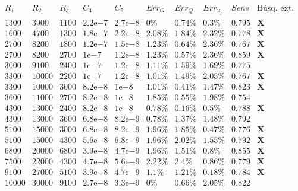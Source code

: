 \documentclass{llncs}
\newcommand{\expnumber}[2]{{#1}\mathrm{e}{#2}}
\begin{document}
	\begin{table}[H]
		$$
		\begin{array}{|c|c|c|c|c|c|c|c|c|c|}
		\hline
		R_1 & R_2 & R_3 & C_4 & C_5 & Err_G & Err_Q & Err_{\omega_p} & Sens & \text{B\'usq. ext.}   \\
		\hline
		1300 & 3900 & 1100 & \expnumber{2.2}{-7} & \expnumber{2.7}{-8} & 0\% & 0.74\% & 0.3\% & 0.795 & \textbf{X} \\
		1600 & 4700 & 1300 & \expnumber{1.8}{-7} & \expnumber{2.2}{-8} & 2.08\% & 1.84\% & 2.32\% & 0.778 & \textbf{X} \\
		2700 & 8200 & 1800 & \expnumber{1.2}{-7} & \expnumber{1.5}{-8} & 1.23\% & 0.64\% & 2.36\% & 0.767 & \textbf{X} \\
		2700 & 8200 & 2700 & \expnumber{1}{-7} & \expnumber{1.2}{-8} & 1.23\% & 0.57\% & 2.36\% & 0.859 & \textbf{X} \\
		3000 & 9100 & 2400 & \expnumber{1}{-7} & \expnumber{1.2}{-8}  & 1.11\% & 1.59\% & 1.69\% & 0.775 &  \\
		3300 & 10000 & 2200 & \expnumber{1}{-7} & \expnumber{1.2}{-8} & 1.01\% & 1.49\% & 2.05\% & 0.767 & \textbf{X} \\
		3300 & 10000 & 3000 & \expnumber{8.2}{-8} & \expnumber{1}{-8} & 1.01\% & 0.41\% & 1.47\% & 0.823 & \textbf{X} \\
		3600 & 11000 & 2700 & \expnumber{8.2}{-8} & \expnumber{1}{-8}  & 1.85\% & 0.55\% & 1.98\% & 0.754 & \\
		4300 & 13000 & 2400 & \expnumber{8.2}{-8} & \expnumber{1}{-8} & 0.78\% & 0.16\% & 0.5\% & 0.788 & \textbf{X} \\
		4300 & 13000 & 3600 & \expnumber{6.8}{-8} & \expnumber{8.2}{-9} & 0.78\% & 1.37\% & 1.48\% & 0.792 & \\
		5100 & 15000 & 3000 & \expnumber{6.8}{-8} & \expnumber{8.2}{-9} & 1.96\% & 1.85\% & 0.47\% & 0.776 & \textbf{X} \\
		5100 & 15000 & 4300 & \expnumber{5.6}{-8} & \expnumber{6.8}{-9} & 1.96\% & 2.02\% & 1.55\% & 0.792 & \textbf{X} \\
		6800 & 20000 & 6800 & \expnumber{3.9}{-8} & \expnumber{4.7}{-9} & 1.96\% & 1.51\% & 0.8\% & 0.855 & \textbf{X} \\
		7500 & 22000 & 4300 & \expnumber{4.7}{-8} & \expnumber{5.6}{-9} & 2.22\% & 2.4\% & 0.86\% & 0.779 & \textbf{X} \\
		9100 & 27000 & 5100 & \expnumber{3.9}{-8} & \expnumber{4.7}{-9} & 1.1\% & 1.21\% & 0.18\% & 0.784 & \textbf{X} \\
		10000 & 30000 & 9100 & \expnumber{2.7}{-8} & \expnumber{3.3}{-9} & 0\% & 0.66\% & 2.05\% & 0.822 & \\

\end{array}$$
\end{table}
\end{document}
